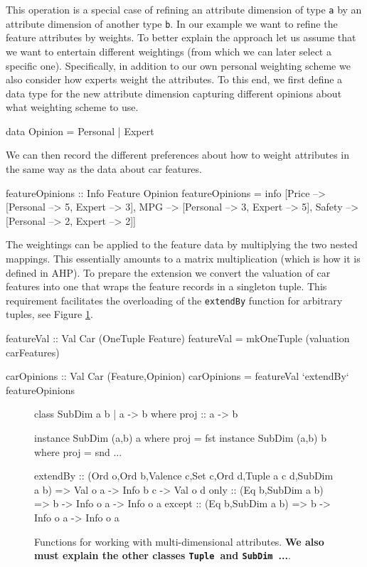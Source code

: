 \documentclass{jfp}
\newcommand{\prog}[1]{\texttt{#1}}
\newcommand{\prg}[2][blue]{\color{#1}\texttt{{\footnotesize #2}}\color{black}}
\begin{document}
This operation is a special case of refining an attribute dimension of type \prog{a} by an attribute dimension of another type \prog{b}. In our example we want to refine the feature attributes by weights. 
%
To better explain the approach let us assume that we want to entertain different weightings (from which we can later select a specific one). Specifically, in addition to our own personal weighting scheme we also consider how experts weight the attributes. 
%
To this end, we first define a data type for the new attribute dimension capturing different opinions about what weighting scheme to use.

\begin{haskellcode}
data Opinion = Personal | Expert
\end{haskellcode}

\noindent
%
We can then record the different preferences about how to weight attributes in the same way as the data about car features.

\begin{haskellcode}
featureOpinions :: Info Feature Opinion
featureOpinions = info [Price  --> [Personal --> 5, Expert --> 3],
                        MPG    --> [Personal --> 3, Expert --> 5],
                        Safety --> [Personal --> 2, Expert --> 2]]
\end{haskellcode}

\noindent
%
The weightings can be applied to the feature data by multiplying the two nested mappings. This essentially amounts to a matrix multiplication (which is how it is defined in AHP).
%
To prepare the extension we convert the valuation of car features into one that wraps the feature records in a singleton tuple. This requirement facilitates the overloading of the \prog{extendBy} function for arbitrary tuples, see Figure \ref{fig:multi}.

\begin{haskellcode}
featureVal :: Val Car (OneTuple Feature)
featureVal = mkOneTuple (valuation carFeatures)

carOpinions :: Val Car (Feature,Opinion)
carOpinions = featureVal `extendBy` featureOpinions
\end{haskellcode}


\begin{figure}[t]
\begin{haskellcode}
class SubDim a b | a -> b where 
  proj :: a -> b

instance SubDim (a,b) a where proj = fst
instance SubDim (a,b) b where proj = snd
...

extendBy :: (Ord o,Ord b,Valence c,Set c,Ord d,Tuple a c d,SubDim a b) => 
             Val o a -> Info b c -> Val o d
only   :: (Eq b,SubDim a b) => b -> Info o a -> Info o a
except :: (Eq b,SubDim a b) => b -> Info o a -> Info o a
\end{haskellcode}
\caption{Functions for working with multi-dimensional attributes. \textbf{We also must explain the other classes \prg{Tuple}\ and \prg{SubDim}\ ...}.}
\label{fig:multi}
\end{figure}
\end{document}
